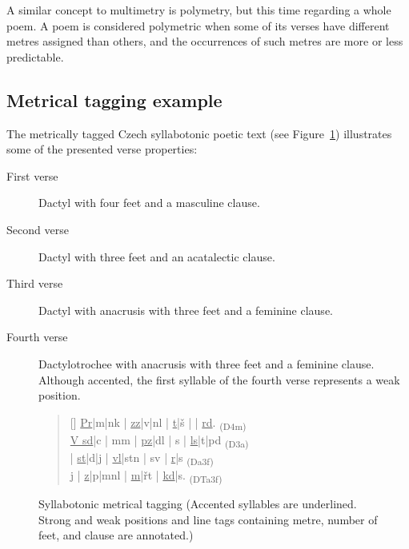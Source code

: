 A similar concept to multimetry is polymetry, but this time regarding a whole poem. A poem is considered polymetric when some of its verses have different metres assigned than others, and the occurrences of such metres are more or less predictable.~\cite{UvodTeorieVerse}

\subsection{Metrical tagging example}
The metrically tagged Czech syllabotonic poetic text (see Figure~\ref{fig:syllabotonic-metrical-tagging}) illustrates some of the presented verse properties:

\begin{description}
\item[First verse] Dactyl with four feet and a masculine clause.
\item[Second verse] Dactyl with three feet and an acatalectic clause.
\item[Third verse] Dactyl with anacrusis with three feet and a feminine clause.
\item[Fourth verse] Dactylotrochee with anacrusis with three feet and a feminine clause. Although accented, the first syllable of the fourth verse represents a weak position.~\cite{UvodTeorieVerse}
\end{description}

\begin{figure}[htpb]
    \centering
    \begin{verse}[\versewidth]
    \uline{Pr}|m|nk | \uline{zz}|v|nl | \uline{t}|š |  | \uline{rd}. \textsubscript{(D4m)}\\
    \uline{V sd}|c | mm | \uline{pz}|dl | s | \uline{ls}|t|pd \textsubscript{(D3a)}\\
     | \uline{st}|d|j | \uline{vl}|stn | sv | \uline{r}|s \textsubscript{(Da3f)}\\
    \uline{j} | \uline{z}|p|mnl | \uline{m}|řt | \uline{kd}|s. \textsubscript{(DTa3f)}
    \end{verse}
    \caption[Syllabotonic metrical tagging]{Syllabotonic metrical tagging (Accented syllables are underlined. Strong and weak positions and line tags containing metre, number of feet, and clause are annotated.)}\label{fig:syllabotonic-metrical-tagging}
\end{figure}

